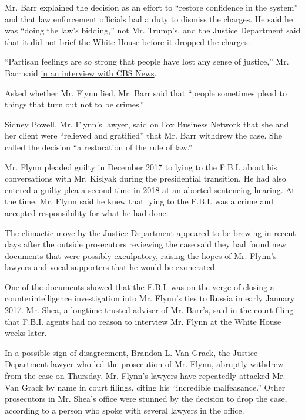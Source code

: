 Mr. Barr explained the decision as an effort to ``restore confidence in
the system'' and that law enforcement officials had a duty to dismiss
the charges. He said he was ``doing the law's bidding,'' not Mr.
Trump's, and the Justice Department said that it did not brief the White
House before it dropped the charges.

``Partisan feelings are so strong that people have lost any sense of
justice,'' Mr. Barr said
\href{https://www.cbsnews.com/news/attorney-general-william-barr-on-michael-flynn-obamacare-and-coronavirus-restrictions-transcript/}{in
an interview with CBS News}.

Asked whether Mr. Flynn lied, Mr. Barr said that ``people sometimes
plead to things that turn out not to be crimes.''

Sidney Powell, Mr. Flynn's lawyer, said on Fox Business Network that she
and her client were ``relieved and gratified'' that Mr. Barr withdrew
the case. She called the decision ``a restoration of the rule of law.''

Mr. Flynn pleaded guilty in December 2017 to lying to the F.B.I. about
his conversations with Mr. Kislyak during the presidential transition.
He had also entered a guilty plea a second time in 2018 at an aborted
sentencing hearing. At the time, Mr. Flynn said he knew that lying to
the F.B.I. was a crime and accepted responsibility for what he had done.

The climactic move by the Justice Department appeared to be brewing in
recent days after the outside prosecutors reviewing the case said they
had found new documents that were possibly exculpatory, raising the
hopes of Mr. Flynn's lawyers and vocal supporters that he would be
exonerated.

One of the documents showed that the F.B.I. was on the verge of closing
a counterintelligence investigation into Mr. Flynn's ties to Russia in
early January 2017. Mr. Shea, a longtime trusted adviser of Mr. Barr's,
said in the court filing that F.B.I. agents had no reason to interview
Mr. Flynn at the White House weeks later.

In a possible sign of disagreement, Brandon L. Van Grack, the Justice
Department lawyer who led the prosecution of Mr. Flynn, abruptly
withdrew from the case on Thursday. Mr. Flynn's lawyers have repeatedly
attacked Mr. Van Grack by name in court filings, citing his ``incredible
malfeasance.'' Other prosecutors in Mr. Shea's office were stunned by
the decision to drop the case, according to a person who spoke with
several lawyers in the office.

